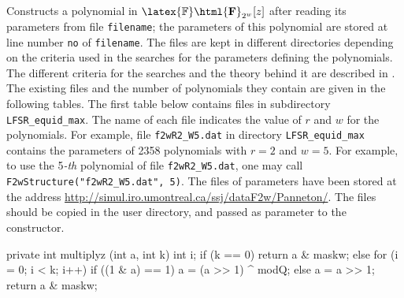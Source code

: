  \begin{tabb}
   Constructs a polynomial in $\latex{\mathbb{F}}\html{\mathbf{F}}_{2^w}[z]$
   after reading its parameters from file {\texttt{filename}};
   the parameters of this polynomial are stored  at line number
   {\texttt{no}} of {\texttt{filename}}.
   The files are kept in different
   directories depending on the criteria used in the searches for the
   parameters defining the polynomials. The different criteria for the
   searches and the theory behind it are described in \cite{rPAN04d,rPAN04t}.
   The existing files and the number of polynomials they contain are
   given in the following tables.
   The first table below contains files in subdirectory
    \texttt{LFSR\_equid\_max}. The name of each
   file indicates the value of $r$ and $w$ for the polynomials.
   For example, file \texttt{f2wR2\_W5.dat} in directory
   \texttt{LFSR\_equid\_max} contains the parameters of 2358
   polynomials with $r=2$ and $w=5$. For example, to use the 5\textit{-th}
    polynomial of file \texttt{f2wR2\_W5.dat}, one may call
   \texttt{F2wStructure("f2wR2\_W5.dat", 5)}.
   The files of parameters have been stored at the address
   \url{http://simul.iro.umontreal.ca/ssj/dataF2w/Panneton/}.
   The files should be copied in the user directory, and passed
   as parameter to the constructor.
 \end{tabb}
\begin{code}
\begin{hide}

   private int multiplyz (int a, int k)
   {
      int i;
      if (k == 0)
         return a & maskw;
      else {
         for (i = 0; i < k; i++) {
            if ((1 & a) == 1) {
               a = (a >> 1) ^ modQ;
            } else
               a = a >> 1;
         }
         return a & maskw;
      }
   }\end{hide}
\end{code}
